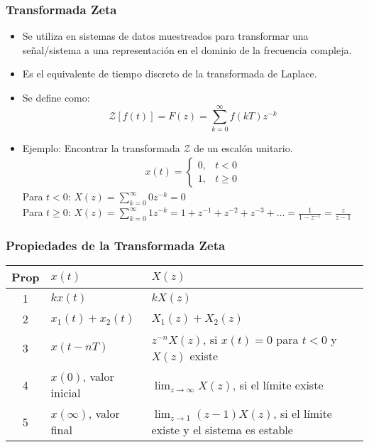 \documentclass[aspectratio=169,handout]{beamer}
\theoremstyle{definition}
\theoremstyle{plain}
\theoremstyle{remark}
\begin{document}
\begin{frame}[<+->]\frametitle{Transformada Zeta}
	\begin{itemize}
		\item Se utiliza en sistemas de datos muestreados para transformar una señal/sistema a una representación en el dominio de la frecuencia compleja.
		\item Es el equivalente de tiempo discreto de la transformada de Laplace.
		\item Se define como:
		\begin{equation*}
			\mathcal{Z}\left[ f(t) \right] = F(z) = \sum_{k=0}^{\infty}f(kT)z^{-k}
		\end{equation*}
		\item Ejemplo: Encontrar la transformada $\mathcal{Z}$ de un escalón unitario.
		\begin{align*}
			x(t) =
			\left\{
			\begin{array}{lr}
				0, & t < 0\\
				1, & t \geq 0
			\end{array}
			\right.
		\end{align*}
		\pause
		Para $t < 0$: $X(z) = \sum_{k=0}^{\infty} 0 z^{-k} = 0$\\
		\vspace*{3mm}
		\pause
		Para $t \geq 0$: $X(z) = \sum_{k=0}^{\infty} 1 z^{-k} = 1 + z^{-1} + z^{-2} + z^{-3} + \dots = \frac{1}{1-z^{-1}} = \frac{z}{z-1}$
	\end{itemize}
\end{frame}

\begin{frame}[c]\frametitle{Propiedades de la Transformada Zeta}
\begin{table}
	\begin{tabular}{cll}
		Prop & $x(t)$ & $X(z)$\\
		\hline
		1 & $kx(t)$ & $kX(z)$\\
		2 & $x_1(t) + x_2(t)$ & $X_1(z) + X_2(z)$\\
		3 & $x(t-nT)$ & $z^{-n}X(z)$, si $x(t) = 0$ para $t<0$ y $X(z)$ existe\\
		4 & $x(0)$, valor inicial & $\lim_{z\rightarrow \infty} X(z)$, si el límite existe\\
		5 & $x(\infty)$, valor final & $\lim_{z\rightarrow 1}(z-1) X(z)$, si el límite existe y el sistema es estable
	\end{tabular}
\end{table}
\end{frame}
\end{document}

